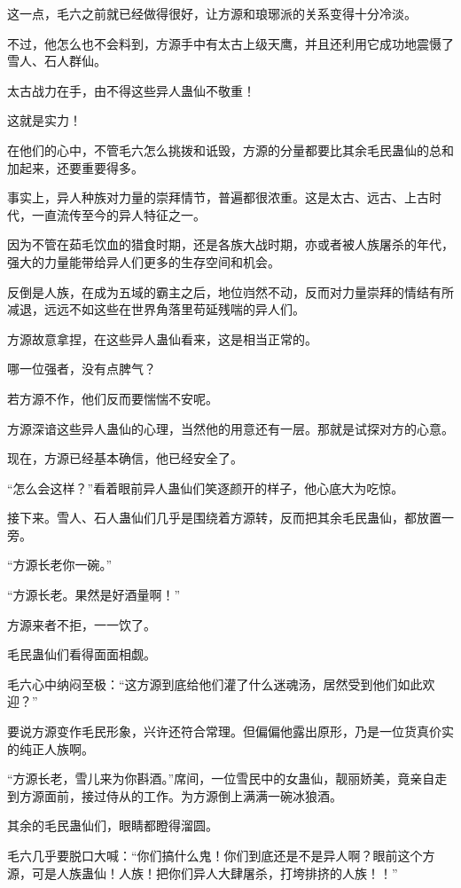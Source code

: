\begin{this_body}
这一点，毛六之前就已经做得很好，让方源和琅琊派的关系变得十分冷淡。

不过，他怎么也不会料到，方源手中有太古上级天鹰，并且还利用它成功地震慑了雪人、石人群仙。

太古战力在手，由不得这些异人蛊仙不敬重！

这就是实力！

在他们的心中，不管毛六怎么挑拨和诋毁，方源的分量都要比其余毛民蛊仙的总和加起来，还要重要得多。

事实上，异人种族对力量的崇拜情节，普遍都很浓重。这是太古、远古、上古时代，一直流传至今的异人特征之一。

因为不管在茹毛饮血的猎食时期，还是各族大战时期，亦或者被人族屠杀的年代，强大的力量能带给异人们更多的生存空间和机会。

反倒是人族，在成为五域的霸主之后，地位岿然不动，反而对力量崇拜的情结有所减退，远远不如这些在世界角落里苟延残喘的异人们。

方源故意拿捏，在这些异人蛊仙看来，这是相当正常的。

哪一位强者，没有点脾气？

若方源不作，他们反而要惴惴不安呢。

方源深谙这些异人蛊仙的心理，当然他的用意还有一层。那就是试探对方的心意。

现在，方源已经基本确信，他已经安全了。

“怎么会这样？”看着眼前异人蛊仙们笑逐颜开的样子，他心底大为吃惊。

接下来。雪人、石人蛊仙们几乎是围绕着方源转，反而把其余毛民蛊仙，都放置一旁。

“方源长老你一碗。”

“方源长老。果然是好酒量啊！”

方源来者不拒，一一饮了。

毛民蛊仙们看得面面相觑。

毛六心中纳闷至极：“这方源到底给他们灌了什么迷魂汤，居然受到他们如此欢迎？”

要说方源变作毛民形象，兴许还符合常理。但偏偏他露出原形，乃是一位货真价实的纯正人族啊。

“方源长老，雪儿来为你斟酒。”席间，一位雪民中的女蛊仙，靓丽娇美，竟亲自走到方源面前，接过侍从的工作。为方源倒上满满一碗冰狼酒。

其余的毛民蛊仙们，眼睛都瞪得溜圆。

毛六几乎要脱口大喊：“你们搞什么鬼！你们到底还是不是异人啊？眼前这个方源，可是人族蛊仙！人族！把你们异人大肆屠杀，打垮排挤的人族！！”


\end{this_body}
